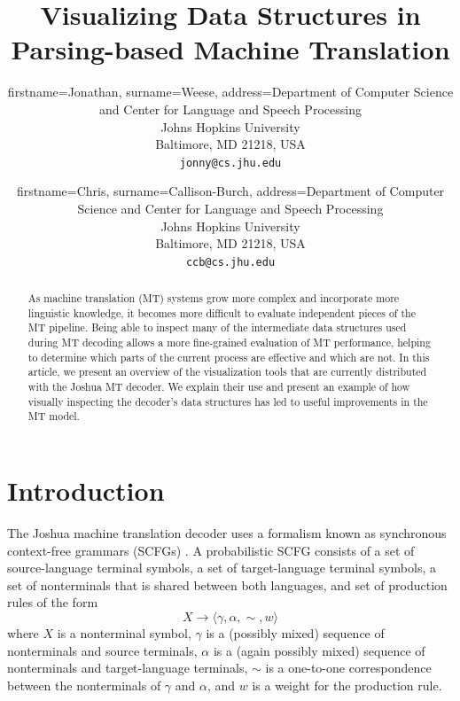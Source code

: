 \documentclass[nologo]{pbml}
\title{Visualizing Data Structures in Parsing-based Machine Translation}
\author{firstname=Jonathan, surname=Weese,
       address={Department of Computer Science and Center for Language and Speech Processing \\
Johns Hopkins University \\
Baltimore, MD 21218, USA \\
{\tt jonny@cs.jhu.edu}}}
\author{firstname=Chris, surname=Callison-Burch, 
       address={Department of Computer Science and Center for Language and Speech Processing \\
Johns Hopkins University \\
Baltimore, MD 21218, USA \\
{\tt ccb@cs.jhu.edu}}}
\begin{document}
\maketitle
\begin{abstract}

As machine translation (MT) systems grow more complex and incorporate more
linguistic knowledge, it becomes more difficult to evaluate independent
pieces of the MT pipeline.
Being able to inspect many of the intermediate data structures used during
MT decoding allows a more fine-grained evaluation of MT performance, helping
to determine which parts of the current process are effective and which are
not.
In this article, we present an overview of the visualization tools that are
currently distributed with the Joshua \cite{Joshua-WMT} MT decoder.
We explain their use and present an example of how visually 
inspecting the decoder's data structures has led to useful improvements in
the MT model.

\end{abstract}


\section{Introduction}





The Joshua machine translation decoder uses a 
formalism known as synchronous context-free grammars (SCFGs) \cite{Chiang2006}.
A probabilistic SCFG consists of a set of source-language terminal symbols, a set of target-language terminal symbols, a set of nonterminals
that is shared between both languages, and set of production rules of the
form
$$X \to \langle \gamma,\alpha,\sim,w \rangle$$
where $X$ is a nonterminal symbol, $\gamma$ is a (possibly mixed) sequence of
nonterminals and source terminals, $\alpha$ is a (again possibly mixed)
sequence of nonterminals and target-language terminals, $\sim$ is a one-to-one
correspondence between the nonterminals of $\gamma$ and $\alpha$, and $w$ is
a weight for the production rule.
\end{document}
